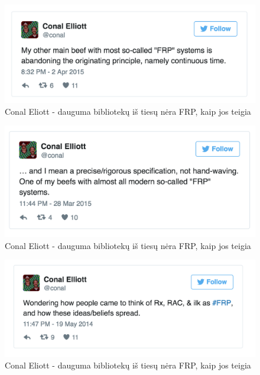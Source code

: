 \documentclass{VUMIFPSmagistrinis}
\begin{document}
\begin{figure}[H]
    \centering
    \includegraphics[scale=0.5]{img/not_frp1}
    \caption{Conal Eliott - dauguma bibliotekų iš tiesų nėra FRP, kaip jos teigia}
    \label{img:not_frp1}
\end{figure}

\begin{figure}[H]
    \centering
    \includegraphics[scale=0.5]{img/not_frp2}
    \caption{Conal Eliott - dauguma bibliotekų iš tiesų nėra FRP, kaip jos teigia}
    \label{img:not_frp2}
\end{figure}

\begin{figure}[H]
    \centering
    \includegraphics[scale=0.5]{img/not_frp3}
    \caption{Conal Eliott - dauguma bibliotekų iš tiesų nėra FRP, kaip jos teigia}
    \label{img:not_frp3}
\end{figure}
\end{document}
